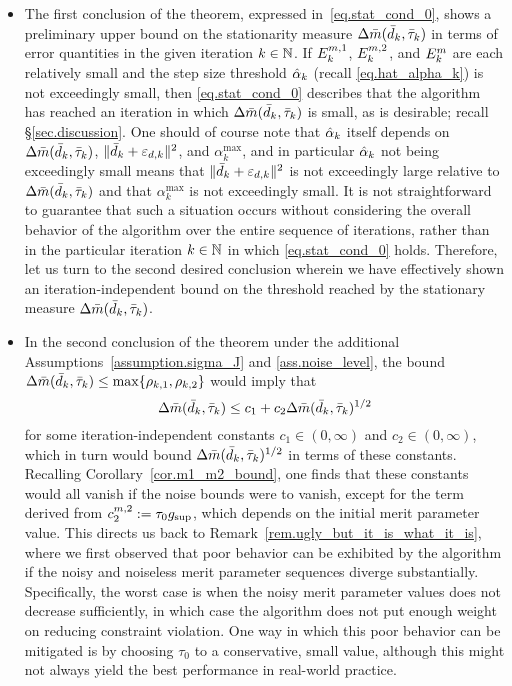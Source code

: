 \begin{itemize}
  \item The first conclusion of the theorem, expressed in~\eqref{eq.stat_cond_0}, shows a preliminary upper bound on the stationarity measure $\Delta {\bar m}({\bar d}_k, {\bar \tau}_k)$ in terms of error quantities in the given iteration $k \in \mathbb{N}$.  If $E_k^{m, 1}$, $E_k^{m, 2}$, and $E_k^m$ are each relatively small and the step size threshold ${\hat \alpha}_k$ (recall \eqref{eq.hat_alpha_k}) is not exceedingly small, then \eqref{eq.stat_cond_0} describes that the algorithm has reached an iteration in which $\Delta {\bar m}({\bar d}_k, {\bar \tau}_k)$ is small, as is desirable; recall \S\ref{sec.discussion}.  One should of course note that ${\hat \alpha}_k$ itself depends on $\Delta {\bar m}({\bar d}_k, {\bar \tau}_k)$, $\|{\bar d}_k + \varepsilon_{d,k}\|^2$, and $\alpha_k^{\max}$, and in particular ${\hat \alpha}_k$ not being exceedingly small means that $\|{\bar d}_k + \varepsilon_{d,k}\|^2$ is not exceedingly large relative to $\Delta {\bar m}({\bar d}_k, {\bar \tau}_k)$ and that $\alpha_k^{\max}$ is not exceedingly small. It is not straightforward to guarantee that such a situation occurs without considering the overall behavior of the algorithm over the entire sequence of iterations, rather than in the particular iteration $k \in \mathbb{N}$ in which \eqref{eq.stat_cond_0} holds.  Therefore, let us turn to the second desired conclusion wherein we have effectively shown an iteration-independent bound on the threshold reached by the stationary measure $\Delta {\bar m}({\bar d}_k, {\bar \tau}_k)$.
  \item In the second conclusion of the theorem under the additional Assumptions~\ref{assumption.sigma_J} and \ref{ass.noise_level}, the bound $\Delta {\bar m}({\bar d}_k, {\bar \tau}_k) \leq \max\{\rho_{k,1}, \rho_{k,2}\}$ would imply that
  \begin{equation*}
    \Delta {\bar m}({\bar d}_k, {\bar \tau}_k) \leq c_1 + c_2 \Delta {\bar m}({\bar d}_k, {\bar \tau}_k)^{1/2}
  \end{equation*}
  for some iteration-independent constants $c_1 \in (0,\infty)$ and $c_2 \in (0,\infty)$, which in turn would bound $\Delta {\bar m}({\bar d}_k, {\bar \tau}_k)^{1/2}$ in terms of these constants.  Recalling Corollary~\ref{cor.m1_m2_bound}, one finds that these constants would all vanish if the noise bounds were to vanish, except for the term derived from $c_2^{m, 2} := \tau_0 g_{\sup}$, which depends on the initial merit parameter value.  This directs us back to Remark~\ref{rem.ugly_but_it_is_what_it_is}, where we first observed that poor behavior can be exhibited by the algorithm if the noisy and noiseless merit parameter sequences diverge substantially.  Specifically, the worst case is when the noisy merit parameter values does not decrease sufficiently, in which case the algorithm does not put enough weight on reducing constraint violation.  One way in which this poor behavior can be mitigated is by choosing $\tau_0$ to a conservative, small value, although this might not always yield the best performance in real-world practice.

\end{itemize}
